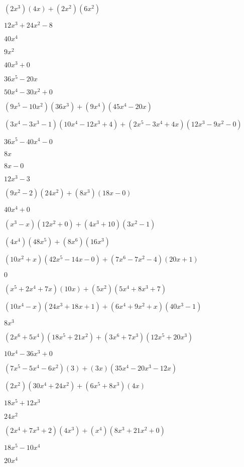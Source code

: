 \documentclass{article}
\begin{document}
\begin{multicols}{2}
$(2x^{3})(4x)+(2x^2)(6x^{2})$\item $12x^{3}+24x^{2}-8$\item $40x^{4}$\item $9x^{2}$\item $40x^{3}+0$\item $36x^{5}-20x$\item $50x^{4}-30x^{2}+0$\item $(9x^{5}-10x^2)(36x^{3})+(9x^{4})(45x^{4}-20x)$\item $(3x^{4}-3x^{3}-1)(10x^{4}-12x^{3}+4)+(2x^{5}-3x^{4}+4x)(12x^{3}-9x^{2}-0)$\item $36x^{5}-40x^{4}-0$\item $8x$\item $8x-0$\item $12x^{3}-3$\item $(9x^2-2)(24x^{2})+(8x^{3})(18x-0)$\item $40x^{4}+0$\item $(x^{3}-x)(12x^{2}+0)+(4x^{3}+10)(3x^{2}-1)$\item $(4x^{4})(48x^{5})+(8x^{6})(16x^{3})$\item $(10x^2+x)(42x^{5}-14x-0)+(7x^{6}-7x^2-4)(20x+1)$\item $0$\item $(x^{5}+2x^{4}+7x)(10x)+(5x^2)(5x^{4}+8x^{3}+7)$\item $(10x^{4}-x)(24x^{3}+18x+1)+(6x^{4}+9x^2+x)(40x^{3}-1)$\item $8x^{3}$\item $(2x^{6}+5x^{4})(18x^{5}+21x^{2})+(3x^{6}+7x^{3})(12x^{5}+20x^{3})$\item $10x^{4}-36x^{3}+0$\item $(7x^{5}-5x^{4}-6x^2)(3)+(3x)(35x^{4}-20x^{3}-12x)$\item $(2x^2)(30x^{4}+24x^{2})+(6x^{5}+8x^{3})(4x)$\item $18x^{5}+12x^{3}$\item $24x^{2}$\item $(2x^{4}+7x^{3}+2)(4x^{3})+(x^{4})(8x^{3}+21x^{2}+0)$\item $18x^{5}-10x^{4}$\item $20x^{4}$\item 
\end{multicols}
\end{document}
